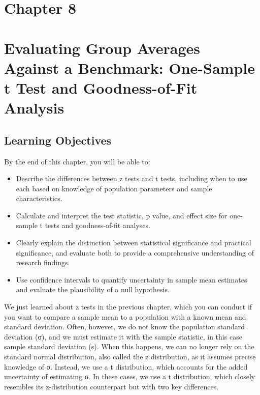 \documentclass[
  letterpaper,
  DIV=11,
  numbers=noendperiod]{scrreprt}
\begin{document}

\chapter{Chapter 8}\label{chapter-8}


\chapter*{Evaluating Group Averages Against a Benchmark: One-Sample t
Test and Goodness-of-Fit
Analysis}\label{evaluating-group-averages-against-a-benchmark-one-sample-t-test-and-goodness-of-fit-analysis}


\section*{Learning Objectives}\label{learning-objectives-7}


By the end of this chapter, you will be able to:

\begin{itemize}
\item
  Describe the differences between z tests and t tests, including when
  to use each based on knowledge of population parameters and sample
  characteristics.
\item
  Calculate and interpret the test statistic, p value, and effect size
  for one-sample t tests and goodness-of-fit analyses.
\item
  Clearly explain the distinction between statistical significance and
  practical significance, and evaluate both to provide a comprehensive
  understanding of research findings.
\item
  Use confidence intervals to quantify uncertainty in sample mean
  estimates and evaluate the plausibility of a null hypothesis.
\end{itemize}

We just learned about z tests in the previous chapter, which you can
conduct if you want to compare a sample mean to a population with a
known mean and standard deviation. Often, however, we do not know the
population standard deviation (σ), and we must estimate it with the
sample statistic, in this case sample standard deviation (s). When this
happens, we can no longer rely on the standard normal distribution, also
called the z distribution, as it assumes precise knowledge of σ.
Instead, we use a t distribution, which accounts for the added
uncertainty of estimating σ. In these cases, we use a t distribution,
which closely resembles its z-distribution counterpart but with two key
differences.
\end{document}
